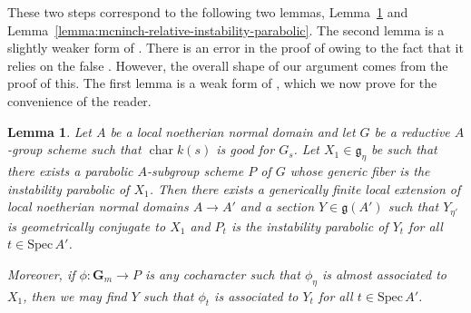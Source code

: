 \documentclass[11pt,reqno]{amsart}
\newtheorem{lemma}[theorem]{Lemma}
\theoremstyle{definition}
\newcommand{\Spec}{\mathrm{Spec} \,}
\newcommand{\bG}{{\mathbf G}}
\newcommand{\fg}{\mathfrak{g}}
\DeclareMathOperator{\chara}{char}
\begin{document}
These two steps correspond to the following two lemmas, Lemma~\ref{lemma:mcninch-existence-of-sections} and Lemma~\ref{lemma:mcninch-relative-instability-parabolic}. The second lemma is a slightly weaker form of \cite[5.6.2]{McNinch-relative-centralizer}. There is an error in the proof of \cite[5.6.2]{McNinch-relative-centralizer} owing to the fact that it relies on the false \cite[2.3.2]{McNinch-relative-centralizer}. However, the overall shape of our argument comes from the proof of this. The first lemma is a weak form of \cite[5.4, Thm.]{McNinch-relative-centralizer}, which we now prove for the convenience of the reader.

\begin{lemma}\label{lemma:mcninch-existence-of-sections}
Let $A$ be a local noetherian normal domain and let $G$ be a reductive $A$-group scheme such that $\chara k(s)$ is good for $G_s$. Let $X_1 \in \fg_\eta$ be such that there exists a parabolic $A$-subgroup scheme $P$ of $G$ whose generic fiber is the instability parabolic of $X_1$. Then there exists a generically finite local extension of local noetherian normal domains $A \to A'$ and a section $Y \in \fg(A')$ such that $Y_{\eta'}$ is geometrically conjugate to $X_1$ and $P_t$ is the instability parabolic of $Y_t$ for all $t \in \Spec A'$.\smallskip 

Moreover, if $\phi: \bG_m \to P$ is any cocharacter such that $\phi_\eta$ is almost associated to $X_1$, then we may find $Y$ such that $\phi_t$ is associated to $Y_t$ for all $t \in \Spec A'$.
\end{lemma}
\end{document}
